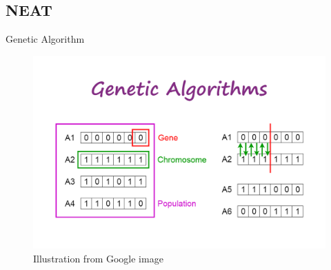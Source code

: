 \documentclass{beamer}
\begin{document}
\subsection{NEAT}

\begin{frame}{Genetic Algorithm}
\begin{figure}[htbp]
  \includegraphics[width = .8\textwidth]{illu}
  \caption{Illustration from Google image}
\end{figure}
\end{frame}
\end{document}
